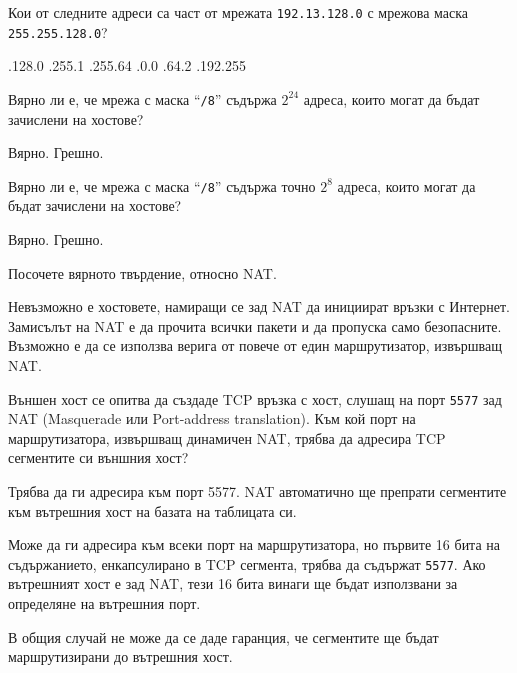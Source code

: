 \begin{questions}
  \question[6] Кои от следните адреси са част от мрежата \texttt{192.13.128.0} с
  мрежова маска \texttt{255.255.128.0}?
  \begin{choices}
    .128.0
    .255.1
    .255.64
    .0.0
    .64.2
    .192.255
  \end{choices}

  \question[6] Вярно ли е, че мрежа с маска "`\texttt{/8}"' съдържа
  $2^{24}$ адреса, които могат да бъдат зачислени на хостове?
  \begin{oneparchoices}
    \choice Вярно.
    \CorrectChoice Грешно.
  \end{oneparchoices}


  \question[6] Вярно ли е, че мрежа с маска "`\texttt{/8}"' съдържа точно
  $2^8$ адреса, които могат да бъдат зачислени на хостове?
  \begin{oneparchoices}
    \choice Вярно.
    \CorrectChoice Грешно.
  \end{oneparchoices}

  \question[6] Посочете вярното твърдение, относно NAT.
  \begin{choices}
    \choice Невъзможно е хостовете, намиращи се зад NAT да инициират връзки с Интернет.
    \choice Замисълът на NAT е да прочита всички пакети и да пропуска само безопасните.
    \CorrectChoice Възможно е да се използва верига от повече от един
    маршрутизатор, извършващ NAT.
  \end{choices}

  \question[6] Външен хост се опитва да създаде TCP връзка с хост, слушащ на
  порт \texttt{5577} зад NAT (\foreignlanguage{english}{Masquerade} или
  \foreignlanguage{english}{Port-address translation}). Към кой порт на
  маршрутизатора, извършващ динамичен NAT, трябва да адресира TCP сегментите си
  външния хост?

  \begin{choices}
    \choice Трябва да ги адресира към порт 5577. NAT автоматично ще препрати
    сегментите към вътрешния хост на базата на таблицата си.

    \choice Може да ги адресира към всеки порт на маршрутизатора, но първите 16
    бита на съдържанието, енкапсулирано в TCP сегмента, трябва да съдържат
    \texttt{5577}. Ако вътрешният хост е зад NAT, тези 16 бита винаги ще бъдат
    използвани за определяне на вътрешния порт.

    \CorrectChoice В общия случай не може да се даде гаранция, че сегментите ще
    бъдат маршрутизирани до вътрешния хост.
  \end{choices}


\end{questions}
